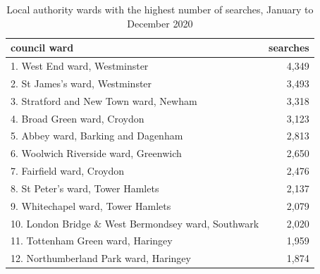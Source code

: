 \documentclass[
  a4paper,
  twoside, 11pt]{article}
\begin{document}
\begin{table}

\caption{\label{tab:table-ward}Local authority wards with the highest number of searches, January to December 2020}
\centering
\begin{tabular}[t]{lr}
\toprule
council ward & searches\\
\midrule
1. West End ward, Westminster & 4,349\\
2. St James's ward, Westminster & 3,493\\
3. Stratford and New Town ward, Newham & 3,318\\
4. Broad Green ward, Croydon & 3,123\\
5. Abbey ward, Barking and Dagenham & 2,813\\
6. Woolwich Riverside ward, Greenwich & 2,650\\
7. Fairfield ward, Croydon & 2,476\\
8. St Peter's ward, Tower Hamlets & 2,137\\
9. Whitechapel ward, Tower Hamlets & 2,079\\
10. London Bridge \& West Bermondsey ward, Southwark & 2,020\\
11. Tottenham Green ward, Haringey & 1,959\\
12. Northumberland Park ward, Haringey & 1,874\\
\bottomrule
\end{tabular}
\end{table}

\restoregeometry
\end{document}
